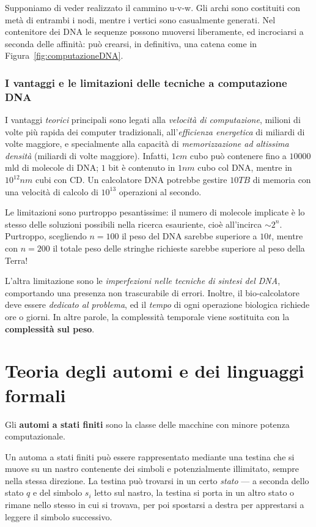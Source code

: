 \documentclass[10pt]{\classname}
\begin{document}
Supponiamo di veder realizzato il cammino u-v-w. Gli archi sono costituiti con
metà di entrambi i nodi, mentre i vertici sono casualmente generati. Nel
contenitore dei DNA le sequenze possono muoversi liberamente, ed incrociarsi a
seconda delle affinità: può crearsi, in definitiva, una catena come in
Figura~\ref{fig:computazioneDNA}.

\subsection{I vantaggi e le limitazioni delle tecniche a computazione DNA}

I vantaggi \emph{teorici} principali sono legati alla \emph{velocità di
computazione}, milioni di volte più rapida dei computer tradizionali,
all'\emph{efficienza energetica} di miliardi di volte maggiore, e specialmente
alla capacità di \emph{memorizzazione ad altissima densità} (miliardi di
volte maggiore). Infatti, $1cm$ cubo può contenere fino a $10000$ mld di
molecole di DNA; $1$ bit è contenuto in $1nm$ cubo col DNA, mentre in $10^{12}nm$
cubi con CD. Un calcolatore DNA potrebbe gestire $10TB$ di memoria con una
velocità di calcolo di $10^{13}$ operazioni al secondo.

Le limitazioni sono purtroppo pesantissime: il numero di molecole implicate è
lo stesso delle soluzioni possibili nella ricerca esauriente, cioè all'incirca
$\sim 2^n$. Purtroppo, scegliendo $n=100$ il peso del DNA sarebbe superiore a
$10t$, mentre con $n=200$ il totale peso delle stringhe richieste sarebbe
superiore al peso della Terra!

L'altra limitazione sono le \emph{imperfezioni nelle tecniche di sintesi del
DNA}, comportando una presenza non trascurabile di errori. Inoltre, il
bio-calcolatore deve essere \emph{dedicato al problema}, ed il \emph{tempo} di
ogni operazione biologica richiede ore o giorni. In altre parole, la
complessità temporale viene sostituita con la \textbf{complessità sul peso}.


\chapter{Teoria degli automi e dei linguaggi formali}

Gli \textbf{automi a stati finiti} sono la classe delle macchine con minore
potenza computazionale.

Un automa a stati finiti può essere rappresentato mediante una testina che si
muove su un nastro contenente dei simboli e potenzialmente illimitato, sempre
nella stessa direzione. La testina può trovarsi in un certo \emph{stato} --- a
seconda dello stato $q$ e del simbolo $s_i$ letto sul nastro, la testina si
porta in un altro stato o rimane nello stesso in cui si trovava, per poi
spostarsi a destra per apprestarsi a leggere il simbolo successivo.
\end{document}
